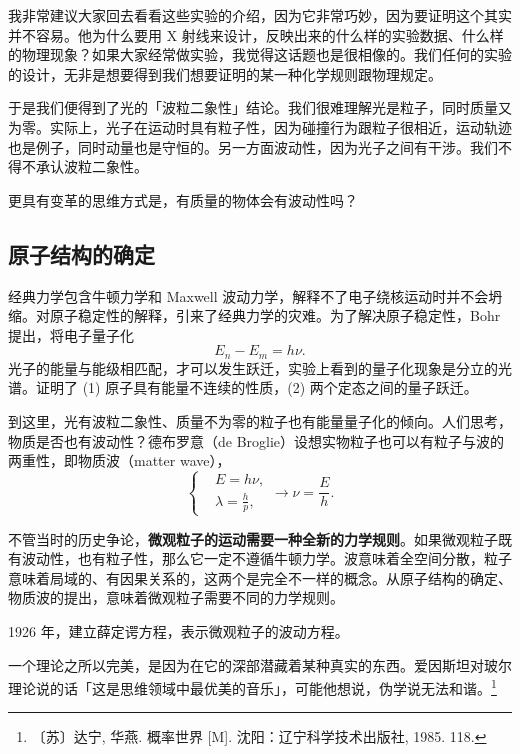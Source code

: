 我非常建议大家回去看看这些实验的介绍，因为它非常巧妙，因为要证明这个其实并不容易。他为什么要用 X 射线来设计，反映出来的什么样的实验数据、什么样的物理现象？如果大家经常做实验，我觉得这话题也是很相像的。我们任何的实验的设计，无非是想要得到我们想要证明的某一种化学规则跟物理规定。

于是我们便得到了光的「波粒二象性」结论。我们很难理解光是粒子，同时质量又为零。实际上，光子在运动时具有粒子性，因为碰撞行为跟粒子很相近，运动轨迹也是例子，同时动量也是守恒的。另一方面波动性，因为光子之间有干涉。我们不得不承认波粒二象性。

更具有变革的思维方式是，有质量的物体会有波动性吗？

\subsection{原子结构的确定}
经典力学包含牛顿力学和 Maxwell 波动力学，解释不了电子绕核运动时并不会坍缩。对原子稳定性的解释，引来了经典力学的灾难。为了解决原子稳定性，Bohr 提出，将电子量子化
\begin{equation}
    E_n - E_m = h\nu. 
\end{equation}
光子的能量与能级相匹配，才可以发生跃迁，实验上看到的量子化现象是分立的光谱。证明了 (1) 原子具有能量不连续的性质，(2) 两个定态之间的量子跃迁。

到这里，光有波粒二象性、质量不为零的粒子也有能量量子化的倾向。人们思考，物质是否也有波动性？德布罗意（de Broglie）设想实物粒子也可以有粒子与波的两重性，即物质波（matter wave），
\begin{equation}
    \left\{
        \begin{aligned}
            &E = h\nu,\\
            &\lambda = \frac hp, 
        \end{aligned}
    \right.
    \rightarrow
     \nu = \frac Eh. 
\end{equation}

不管当时的历史争论，\textbf{微观粒子的运动需要一种全新的力学规则}。如果微观粒子既有波动性，也有粒子性，那么它一定不遵循牛顿力学。波意味着全空间分散，粒子意味着局域的、有因果关系的，这两个是完全不一样的概念。从原子结构的确定、物质波的提出，意味着微观粒子需要不同的力学规则。

1926 年，建立薛定谔方程，表示微观粒子的波动方程。

一个理论之所以完美，是因为在它的深部潜藏着某种真实的东西。爱因斯坦对玻尔理论说的话「这是思维领域中最优美的音乐」，可能他想说，伪学说无法和谐。\footnote{〔苏〕达宁, 华燕. 概率世界 [M]. 沈阳：辽宁科学技术出版社, 1985. 118. }

